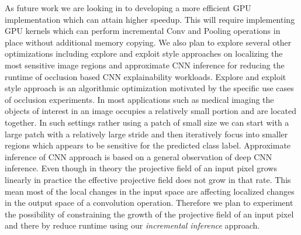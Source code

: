 \documentclass[10, sigconf]{acmart}
\begin{document}
As future work we are looking in to developing a more efficient GPU implementation which can attain higher speedup. This will require implementing GPU kernels which can perform incremental Conv and Pooling operations in place without additional memory copying.
We also plan to explore several other optimizations including explore and exploit style approaches on localizing the most sensitive image regions and approximate CNN inference for reducing the runtime of occlusion based CNN explainability workloads.
Explore and exploit style approach is an algorithmic optimization motivated by the specific use cases of occlusion experiments.
In most applications such as medical imaging the objects of interest in an image occupies a relatively small portion and are located together.
In such settings rather using a patch of small size we can start with a large patch with a relatively large stride and then iteratively focus into smaller regions which appears to be sensitive for the predicted class label.
Approximate inference of CNN approach is based on a general observation of deep CNN inference.
Even though in theory the projective field of an input pixel grows linearly in practice the effective projective field does not grow in that rate.
This mean most of the local changes in the input space are affecting localized changes in the output space of a convolution operation.
Therefore we plan to experiment the possibility of constraining the growth of the projective field of an input pixel and there by reduce runtime using our \textit{incremental inference} approach.



\end{document}
